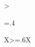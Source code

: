 \begin{xltabular}{\linewidth}{>{\hsize=.4\hsize\raggedright\arraybackslash}X>{\hsize=.6\hsize}X}
    \bottomrule
\end{xltabular}
\egroup


